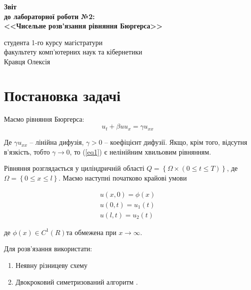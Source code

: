\documentclass[a4paper,12pt]{article}
\begin{document}
	
	\begin{titlepage}
		\vspace*{6cm}
		\begin{center}
			
			\large
			\textbf{Звіт}\\
			\textbf{до лабораторної роботи №2:}\\
			\textbf{<<Чисельне розв'язання рівняння Бюргерса>>}
			
		\end{center}
		
		\vspace{8cm}
		\begin{flushright}
			студента 1-го курсу магістратури\\
			факультету комп'ютерних наук та кібернетики\\
			Кравця Олексія
		\end{flushright}
		
	\end{titlepage}

\newpage
\tableofcontents
\newpage
\section{Постановка задачі}

Маємо рівняння Бюргерса:
\begin{equation} \label{eq1}
	u_t + \beta u u_x = \gamma u_{xx}
\end{equation}

Де $\gamma u_{xx}$ -- лінійна дифузія, $\gamma >0$ -- коефіцієнт дифузії. Якщо, крім того, відсутня в'язкість, тобто $\gamma \rightarrow 0$, то (\ref{eq1}) є нелінійним хвильовим рівнянням.

Рівняння розглядається у циліндричній області $Q = \left\{ \Omega \times (0 \le t \le T) \right\}$, де $\Omega = \left\{ 0 \le x \le l \right\}$. Маємо наступні початково крайові умови

\begin{equation} \label{eq2}
	\begin{aligned}
		u(x,0) = \phi(x) \\
		u(0,t) = u_1(t) \\
		u(l,t) = u_2 (t)
	\end{aligned}	
\end{equation}

де $\phi(x) \in C^1(R)$та обмежена при $x \rightarrow \infty$.

Для розв'язання використати:
\begin{enumerate}
	\item Неявну різницеву схему
	\item Двокроковий симетризований алгоритм \cite{TwoStep}.
\end{enumerate}
\end{document}
